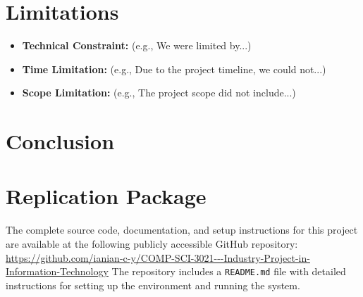 \documentclass[12pt,a4paper]{article}
\begin{document}
    \section{Limitations}
    \begin{itemize}[label=$\bullet$, leftmargin=*]
        \item \textbf{Technical Constraint:} (e.g., We were limited by...) \lipsum[13]
        \item \textbf{Time Limitation:} (e.g., Due to the project timeline, we could not...) \lipsum[14]
        \item \textbf{Scope Limitation:} (e.g., The project scope did not include...) \lipsum[15]
    \end{itemize}


    \clearpage
    \section{Conclusion}
    \cite{example_website}
    \lipsum[16-17]


    \section{Replication Package}
    The complete source code, documentation, and setup instructions for this project are available at the following publicly accessible GitHub repository:
    \url{https://github.com/ianian-c-y/COMP-SCI-3021---Industry-Project-in-Information-Technology}
    The repository includes a \texttt{README.md} file with detailed instructions for setting up the environment and running the system.

    \clearpage %
    \printbibliography[title={References}]
\end{document}
